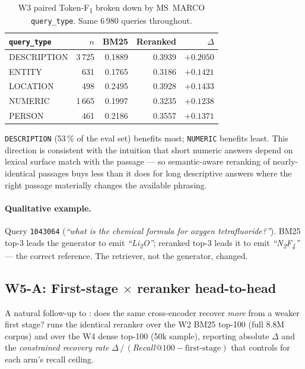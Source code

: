 \documentclass[11pt,a4paper]{article}
\makeatletter
\newcommand{\fdev}{6\,980}
\newcommand{\msmarco}{MS~MARCO}
\newcommand{\F}{F\textsubscript{1}}
\newcommand{\Tokenf}{Token-\F}
\newcommand{\recallH}{Recall@100}
\newcommand{\bmtwofive}{BM25}
\makeatother
\begin{document}
\begin{table}[H]
  \centering
  \caption{W3 paired \Tokenf{} broken down by \msmarco{}
  \texttt{query\_type}.  Same \fdev{} queries throughout.}
  \label{tab:bucket-by-type}
  \begin{tabular}{lrrrr}
    \toprule
    \texttt{query\_type} & $n$ & \bmtwofive{} & Reranked & $\Delta$ \\
    \midrule
    DESCRIPTION & 3\,725 & 0.1889 & 0.3939 & $\mathbf{+0.2050}$ \\
    ENTITY      &   631  & 0.1765 & 0.3186 & $+0.1421$ \\
    LOCATION    &   498  & 0.2495 & 0.3928 & $+0.1433$ \\
    NUMERIC     & 1\,665 & 0.1997 & 0.3235 & $+0.1238$ \\
    PERSON      &   461  & 0.2186 & 0.3557 & $+0.1371$ \\
    \bottomrule
  \end{tabular}
\end{table}

\texttt{DESCRIPTION} (53\,\% of the eval set) benefits most;
\texttt{NUMERIC} benefits least.  This direction is consistent with
the intuition that short numeric answers depend on lexical surface
match with the passage --- so semantic-aware reranking of nearly-
identical passages buys less than it does for long descriptive
answers where the right passage materially changes the available
phrasing.

\paragraph{Qualitative example.}  Query \texttt{1043064}
(\emph{``what is the chemical formula for oxygen tetrafluoride?''}).
\bmtwofive{} top-3 leads the generator to emit \emph{``Li\textsubscript{2}O''};
reranked top-3 leads it to emit \emph{``N\textsubscript{2}F\textsubscript{4}''}
--- the correct reference.  The retriever, not the generator,
changed.

\subsection{W5-A: First-stage $\times$ reranker head-to-head}
\label{sec:w5a}

A natural follow-up to : does the same
cross-encoder recover \emph{more} from a weaker first stage?
 runs the identical reranker over the W2
\bmtwofive{} top-100 (full 8.8M corpus) and over the W4 dense
top-100 (50k sample), reporting absolute $\Delta$ and the
\emph{constrained recovery rate} $\Delta\,/\,(\recallH{} - \text{first-stage})$
that controls for each arm's recall ceiling.
\end{document}
